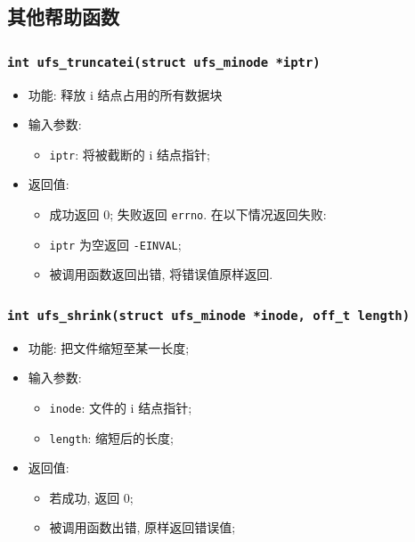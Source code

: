 \documentclass[nofonts, titlepage]{ctexart}
\begin{document}
  \subsection{其他帮助函数}
  \subsubsection[\texttt{ufs\_truncatei}]{\texttt{int ufs\_truncatei(struct ufs\_minode *iptr)}}
  \begin{itemize}
\item
  功能: 释放 i 结点占用的所有数据块
\item
  输入参数:

  \begin{itemize}
  \item
    \texttt{iptr}: 将被截断的 i 结点指针;
  \end{itemize}
\item
  返回值:

  \begin{itemize}
  \item
    成功返回 0; 失败返回 \texttt{errno}. 在以下情况返回失败:
  \item
    \texttt{iptr} 为空返回 \texttt{-EINVAL};
  \item
    被调用函数返回出错, 将错误值原样返回.
  \end{itemize}
  \end{itemize}
  \subsubsection[\texttt{ufs\_shrink}]{\texttt{int ufs\_shrink(struct
  ufs\_minode *inode, off\_t length)}}
  \begin{itemize}
        \item 功能: 把文件缩短至某一长度;
        \item 输入参数:
        \begin{itemize}
            \item \verb'inode': 文件的 i 结点指针;
            \item \verb'length': 缩短后的长度;
        \end{itemize}
        \item 返回值:
        \begin{itemize}
            \item 若成功, 返回 0;
            \item 被调用函数出错, 原样返回错误值;
        \end{itemize}
  \end{itemize}
\end{document}
